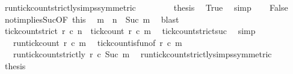 \begin{isabellebody}
\ run{\isacharunderscore}tick{\isacharunderscore}count{\isacharunderscore}strictly{\isachardot}simps{\isacharparenleft}{}{\isacharparenright}{\isacharbrackleft}symmetric{\isacharbrackright}\ \isacommand{{\isachardot}}\isamarkupfalse%
\isanewline
\ \ \ \ \isamarkupfalse%
\ \isamarkupfalse%
\ {\isacharquery}thesis\ \isamarkupfalse%
\ True\ \isamarkupfalse%
\ simp\isanewline
{}\isamarkupfalse%
\isanewline
\ \ \isamarkupfalse%
\ False\isanewline
\ \ \isamarkupfalse%
\ not{}{\isacharunderscore}implies{\isacharunderscore}Suc{\isacharbrackleft}OF\ this{\isacharbrackright}\ \isamarkupfalse%
\ m\ \ {\isacharasterisk}{\isacharcolon}{\isacartoucheopen}n\ {\isacharequal}\ Suc\ m{\isacartoucheclose}\ \isamarkupfalse%
\ blast\isanewline
\ \ \isamarkupfalse%
\ {\isacartoucheopen}tick{\isacharunderscore}count{\isacharunderscore}strict\ r\ c\ n\ {\isacharequal}\ tick{\isacharunderscore}count\ r\ c\ m{\isacartoucheclose}\ \isamarkupfalse%
\ tick{\isacharunderscore}count{\isacharunderscore}strict{\isacharunderscore}suc\ \isamarkupfalse%
\ simp\isanewline
\ \ \isamarkupfalse%
\ \isamarkupfalse%
\ {\isacartoucheopen}{\isachardot}{\isachardot}{\isachardot}\ {\isacharequal}\ run{\isacharunderscore}tick{\isacharunderscore}count\ r\ c\ m{\isacartoucheclose}\ \isamarkupfalse%
\ tick{\isacharunderscore}count{\isacharunderscore}is{\isacharunderscore}fun{\isacharbrackleft}of\ {\isacartoucheopen}r{\isacartoucheclose}\ {\isacartoucheopen}c{\isacartoucheclose}\ {\isacartoucheopen}m{\isacartoucheclose}{\isacharbrackright}\ \isacommand{{\isachardot}}\isamarkupfalse%
\isanewline
\ \ \isamarkupfalse%
\ \isamarkupfalse%
\ {\isacartoucheopen}{\isachardot}{\isachardot}{\isachardot}\ {\isacharequal}\ run{\isacharunderscore}tick{\isacharunderscore}count{\isacharunderscore}strictly\ r\ c\ {\isacharparenleft}Suc\ m{\isacharparenright}{\isacartoucheclose}\ \isamarkupfalse%
\ run{\isacharunderscore}tick{\isacharunderscore}count{\isacharunderscore}strictly{\isachardot}simps{\isacharparenleft}{}{\isacharparenright}{\isacharbrackleft}symmetric{\isacharbrackright}\ \isacommand{{\isachardot}}\isamarkupfalse%
\isanewline
\ \ \isamarkupfalse%
\ \isamarkupfalse%
\ {\isacharquery}thesis\ \isamarkupfalse%

\end{isabellebody}
